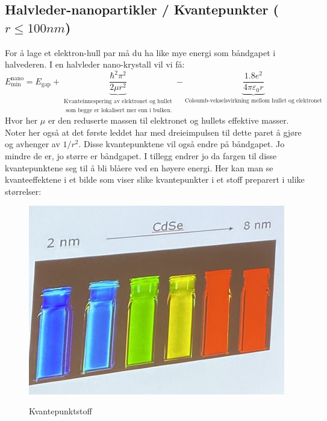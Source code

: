 \documentclass{article}
\begin{document}
\subsection{Halvleder-nanopartikler / Kvantepunkter ($r \le 100nm$)}
For å lage et elektron-hull par må du ha like mye energi som båndgapet i halvederen. I en halvleder nano-krystall vil vi få:
\begin{equation}
  E^{\text{nano}}_{\text{min}} = E_{\text{gap}} + \underbrace{ \frac{\hbar^2 \pi^2}{2 \mu r^2}}_{\substack{\text{Kvanteinnespering av elektronet og hullet} \\ \text{ som begge er lokalisert mer enn i bulken.}}} - \underbrace{\frac{1.8 e^2}{4 \pi \varepsilon_0 r}}_{\text{Coloumb-vekselsvirkning mellom hullet og elektronet}}
\end{equation}
Hvor her $\mu$ er den reduserte massen til elektronet og hullets effektive masser. Noter her også at det første leddet har med dreieimpulsen til dette paret å gjøre og avhenger av $1/r^2$. Disse kvantepunktene vil også endre på båndgapet. Jo mindre de er, jo større er båndgapet. I tillegg endrer jo da fargen til disse kvantepunktene seg til å bli blåere ved en høyere energi. Her kan man se kvanteeffektene i et bilde som viser slike kvantepunkter i et stoff preparert i ulike størrelser:
\begin{figure}[h]
  \centering
  \caption{Kvantepunktstoff}
  \includegraphics[scale=0.4]{bilder/kvantepunktstoff.jpg}
  \label{fig:kvantepunktstoff}
\end{figure}


\newpage
\printbibliography
\end{document}
